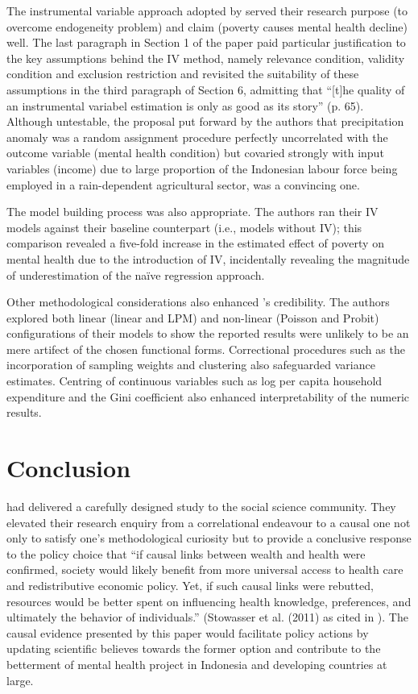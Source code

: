 The instrumental variable approach adopted by \textcite{hanandita:2014} served their research purpose (to overcome endogeneity problem) and claim (poverty causes mental health decline) well. The last paragraph in Section 1 of the paper paid particular justification to the key assumptions behind the IV method, namely relevance condition, validity condition and exclusion restriction and revisited the suitability of these assumptions in the third paragraph of Section 6, admitting that ``[t]he quality of an instrumental variabel estimation is only as good as its story'' (p. 65). Although untestable, the proposal put forward by the authors that precipitation anomaly was a random assignment procedure perfectly uncorrelated with the outcome variable (mental health condition) but covaried strongly with input variables (income) due to large proportion of the Indonesian labour force being employed in a rain-dependent agricultural sector, was a convincing one.

The model building process was also appropriate. The authors ran their IV models against their baseline counterpart (i.e., models without IV); this comparison revealed a five-fold increase in the estimated effect of poverty on mental health due to the introduction of IV, incidentally revealing the magnitude of underestimation of the na{\"i}ve regression approach.

Other methodological considerations also enhanced \textcite{hanandita:2014}'s credibility. The authors explored both linear (linear and LPM) and non-linear (Poisson and Probit) configurations of their models to show the reported results were unlikely to be an mere artifect of the chosen functional forms. Correctional procedures such as the incorporation of sampling weights and clustering also safeguarded variance estimates. Centring of continuous variables such as log per capita household expenditure and the Gini coefficient also enhanced interpretability of the numeric results.

\section{Conclusion}

\textcite{hanandita:2014} had delivered a carefully designed study to the social science community. They elevated their research enquiry from a correlational endeavour to a causal one not only to satisfy one's methodological curiosity but to provide a conclusive response to the policy choice that ``if causal links between wealth and health were confirmed, society would likely benefit from more universal access to health care and redistributive economic policy. Yet, if such causal links were rebutted, resources would be better spent on influencing health knowledge, preferences, and ultimately the behavior of individuals.'' (Stowasser et al. (2011) as cited in \textcite{hanandita:2014}). The causal evidence presented by this paper would facilitate policy actions by updating scientific believes towards the former option and contribute to the betterment of mental health project in Indonesia and developing countries at large.
